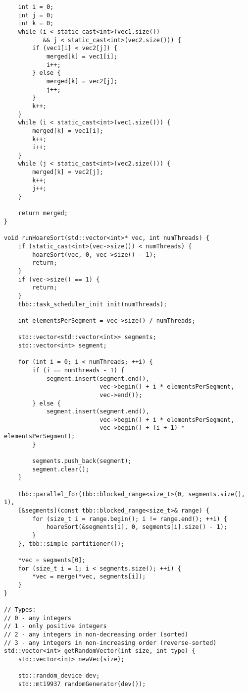 \documentclass{report}
\begin{document}
\begin{lstlisting}
    int i = 0;
    int j = 0;
    int k = 0;
    while (i < static_cast<int>(vec1.size())
           && j < static_cast<int>(vec2.size())) {
        if (vec1[i] < vec2[j]) {
            merged[k] = vec1[i];
            i++;
        } else {
            merged[k] = vec2[j];
            j++;
        }
        k++;
    }
    while (i < static_cast<int>(vec1.size())) {
        merged[k] = vec1[i];
        k++;
        i++;
    }
    while (j < static_cast<int>(vec2.size())) {
        merged[k] = vec2[j];
        k++;
        j++;
    }

    return merged;
}

void runHoareSort(std::vector<int>* vec, int numThreads) {
    if (static_cast<int>(vec->size()) < numThreads) {
        hoareSort(vec, 0, vec->size() - 1);
        return;
    }
    if (vec->size() == 1) {
        return;
    }
    tbb::task_scheduler_init init(numThreads);

    int elementsPerSegment = vec->size() / numThreads;

    std::vector<std::vector<int>> segments;
    std::vector<int> segment;

    for (int i = 0; i < numThreads; ++i) {
        if (i == numThreads - 1) {
            segment.insert(segment.end(),
                           vec->begin() + i * elementsPerSegment,
                           vec->end());
        } else {
            segment.insert(segment.end(),
                           vec->begin() + i * elementsPerSegment,
                           vec->begin() + (i + 1) * elementsPerSegment);
        }

        segments.push_back(segment);
        segment.clear();
    }

    tbb::parallel_for(tbb::blocked_range<size_t>(0, segments.size(), 1),
    [&segments](const tbb::blocked_range<size_t>& range) {
        for (size_t i = range.begin(); i != range.end(); ++i) {
            hoareSort(&segments[i], 0, segments[i].size() - 1);
        }
    }, tbb::simple_partitioner());

    *vec = segments[0];
    for (size_t i = 1; i < segments.size(); ++i) {
        *vec = merge(*vec, segments[i]);
    }
}

// Types:
// 0 - any integers
// 1 - only positive integers
// 2 - any integers in non-decreasing order (sorted)
// 3 - any integers in non-increasing order (reverse-sorted)
std::vector<int> getRandomVector(int size, int type) {
    std::vector<int> newVec(size);

    std::random_device dev;
    std::mt19937 randomGenerator(dev());


\end{lstlisting}
\end{document}
